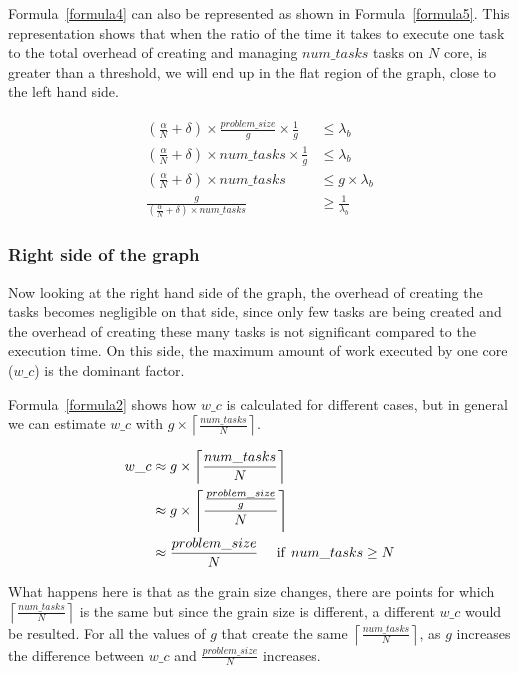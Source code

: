 Formula~\ref{formula4} can also be represented as shown in Formula~\ref{formula5}. This representation shows that when the ratio of the time it takes to execute one task to the total overhead of creating and managing $num\_{tasks}$ tasks on $N$ core, is greater than a threshold, we will end up in the flat region of the graph, close to the left hand side.


\begin{equation}\label{formula5}
\begin{aligned}
(\frac{\alpha}{N}+\delta)\times{\frac{problem\_{size}}{g}}\times{\frac{1}{g}}&\leq{\lambda_b}\\
(\frac{\alpha}{N}+\delta)\times{num\_{tasks}}\times{\frac{1}{g}}&\leq{\lambda_b}\\
(\frac{\alpha}{N}+\delta)\times{num\_{tasks}}&\leq{g\times\lambda_b}\\	
\frac{g}{(\frac{\alpha}{N}+\delta)\times{num\_{tasks}}}&\geq{\frac{1}{\lambda_b}}
\end{aligned}
\end{equation}


\subsubsection{Right side of the graph}
Now looking at the right hand side of the graph, the overhead of creating the tasks becomes negligible on that side, since only few tasks are being created and the overhead of creating these many tasks is not significant compared to the execution time. On this side, the maximum amount of work executed by one core ($w\_c$) is the dominant factor.

Formula~\ref{formula2} shows how $w\_c$ is calculated for different cases, but in general we can estimate $w\_c$ with $g\times\left \lceil{\frac{num\_{tasks}}{N}}\right \rceil$. 

\begin{equation}\label{formula6}
\begin{aligned}
w\_c&\approx{g\times\left \lceil{\frac{num\_{tasks}}{N}}\right \rceil}\\
&\approx{g\times\left \lceil{\frac{\frac{problem\_{size}}{g}}{N}}\right \rceil}\\
&\approx{\frac{problem\_{size}}{N}} \:\:\text{\:\:\:\:if\:\:} num\_{tasks}\geq{N}
\end{aligned}
\end{equation}

What happens here is that as the grain size changes, there are points for which $\left \lceil{\frac{num\_{tasks}}{N}}\right \rceil$ is the same but since the grain size is different, a different $w\_c$ would be resulted. 
For all the values of $g$ that create the same $\left \lceil{\frac{num\_{tasks}}{N}}\right \rceil$, as $g$ increases the difference between $w\_c$ and $\frac{problem\_{size}}{N}$ increases. 

